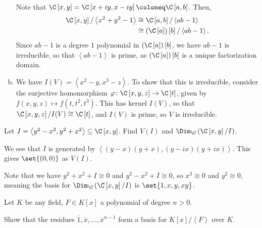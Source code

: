 \documentclass[10pt]{mypackage}
\begin{document}
\begin{solution}
\begin{enumerate}[(a)]
      Note that $\C\left[ x,y \right] = \C\left[ x + iy,x-iy \right]\coloneq \C\left[ a,b \right]$. Then,
      \begin{align*}
        \C\left[ x,y \right]/\left\langle x^2 + y^2 - 1 \right\rangle &\cong \C\left[ a,b \right]/\left\langle ab-1 \right\rangle\\
                                                                      &\cong \left( \C\left[ a \right] \right)\left[ b \right]/\left\langle ab-1 \right\rangle.
      \end{align*}
      Since $ab-1$ is a degree $1$ polynomial in $\left( \C\left[ a \right] \right)\left[ b \right]$, we have $ab - 1$ is irreducible, so that $\left\langle ab-1 \right\rangle$ is prime, as $\left( \C\left[ a \right] \right)\left[ b \right]$ is a unique factorization domain.
    \item We have $I(V) = \left\langle x^2 - y,x^3 - z \right\rangle$. To show that this is irreducible, consider the surjective homomorphism $\varphi\colon \C\left[ x,y,z \right]\rightarrow \C\left[ t \right]$, given by $f\left( x,y,z \right)\mapsto f\left( t,t^2,t^3 \right)$. This has kernel $I(V)$, so that $\C\left[ x,y,z \right]/I(V)\cong \C\left[ t \right]$, and $I(V)$ is prime, so $V$ is irreducible.
  \end{enumerate}
\end{solution}
\begin{exercise}[Exercise 1.36]
  Let $I = \left\langle y^2-x^2,y^2 + x^2 \right\rangle\subseteq \C\left[ x,y \right]$. Find $V(I)$ and $\Dim_{\C}\left( \C\left[ x,y \right]/I \right)$.
\end{exercise}
\begin{solution}
  We see that $I$ is generated by $\left\langle \left( y-x \right)\left( y+x \right),\left( y-ix \right)\left( y+ix \right) \right\rangle$. This gives $\set{(0,0)}$ as $V(I)$.\newline

  Note that we have $y^2 + x^2 + I \cong 0$ and $y^2 - x^2 + I \cong 0$, so $x^2\cong 0$ and $y^2\cong 0$, meaning the basis for $\Dim_{\C}\left( \C\left[ x,y \right]/I \right) $ is $ \set{1,x,y,xy}$.
\end{solution}
\begin{exercise}[Exercise 1.37]
  Let $K$ be any field, $F\in K\left[ x \right]$ a polynomial of degree $n > 0$.\newline

  Show that the residues $\overline{1},\overline{x},\dots,\overline{x}^{n-1}$ form a basis for $K\left[ x \right]/\left\langle F \right\rangle$ over $K$.
\end{exercise}
\end{document}
